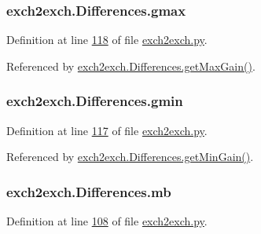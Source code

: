 \subsubsection[{\texorpdfstring{gmax}{gmax}}]{\setlength{\rightskip}{0pt plus 5cm}exch2exch.\+Differences.\+gmax}\hypertarget{classexch2exch_1_1_differences_a569f2a6fa0e33ad725c3c3ada259ddcc}{}\label{classexch2exch_1_1_differences_a569f2a6fa0e33ad725c3c3ada259ddcc}


Definition at line \hyperlink{exch2exch_8py_source_l00118}{118} of file \hyperlink{exch2exch_8py_source}{exch2exch.\+py}.



Referenced by \hyperlink{exch2exch_8py_source_l00135}{exch2exch.\+Differences.\+get\+Max\+Gain()}.

\subsubsection[{\texorpdfstring{gmin}{gmin}}]{\setlength{\rightskip}{0pt plus 5cm}exch2exch.\+Differences.\+gmin}\hypertarget{classexch2exch_1_1_differences_a33c9add531b5b46c49ae322657343382}{}\label{classexch2exch_1_1_differences_a33c9add531b5b46c49ae322657343382}


Definition at line \hyperlink{exch2exch_8py_source_l00117}{117} of file \hyperlink{exch2exch_8py_source}{exch2exch.\+py}.



Referenced by \hyperlink{exch2exch_8py_source_l00132}{exch2exch.\+Differences.\+get\+Min\+Gain()}.

\subsubsection[{\texorpdfstring{mb}{mb}}]{\setlength{\rightskip}{0pt plus 5cm}exch2exch.\+Differences.\+mb}\hypertarget{classexch2exch_1_1_differences_a81c81e9c15b5ea8a5d39bb99d85250e1}{}\label{classexch2exch_1_1_differences_a81c81e9c15b5ea8a5d39bb99d85250e1}


Definition at line \hyperlink{exch2exch_8py_source_l00108}{108} of file \hyperlink{exch2exch_8py_source}{exch2exch.\+py}.

